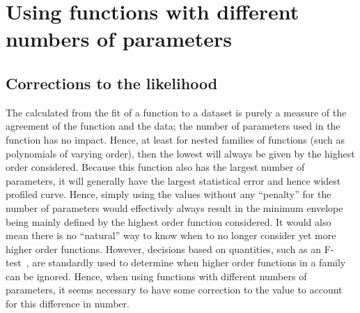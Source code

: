 \section{Using functions with different numbers of parameters} %
\label{sec:correction}

\subsection{Corrections to the likelihood}
\label{sec:correction:corrections}

The \nll calculated from the fit of a function to a dataset is purely a measure
of the agreement of the function and the data; the number of parameters
used in the function has no impact. Hence, at least for nested families of
functions (such as polynomials of varying order), then the lowest \nll will
always be given by the highest order considered.
Because this function also has the
largest number of parameters, it will generally have the largest statistical
error and hence widest profiled \nll curve.
Hence, simply using the \nll values
without any ``penalty'' for the number of parameters would effectively
always result in the minimum envelope being mainly defined by the highest
order function considered. It would also mean there is no ``natural'' way to know when
to no longer consider yet more higher order functions. However, decisions based
on quantities, such as an F-test~\cite{ref:ftest},
are standardly used to determine when higher order functions in
a family can be ignored. Hence, when using functions with different
numbers of parameters, it seems necessary to have some correction to the \nll
value to account for this difference in number.

